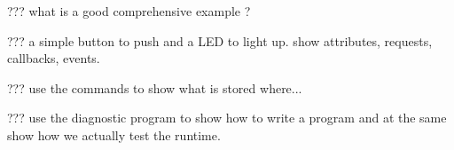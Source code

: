 %

??? what is a good comprehensive example ?

??? a simple button to push and a LED to light up. show attributes, requests, callbacks, events.

??? use the commands to show what is stored where...

??? use the diagnostic program to show how to write a program and at the same show how we actually test the runtime. 
